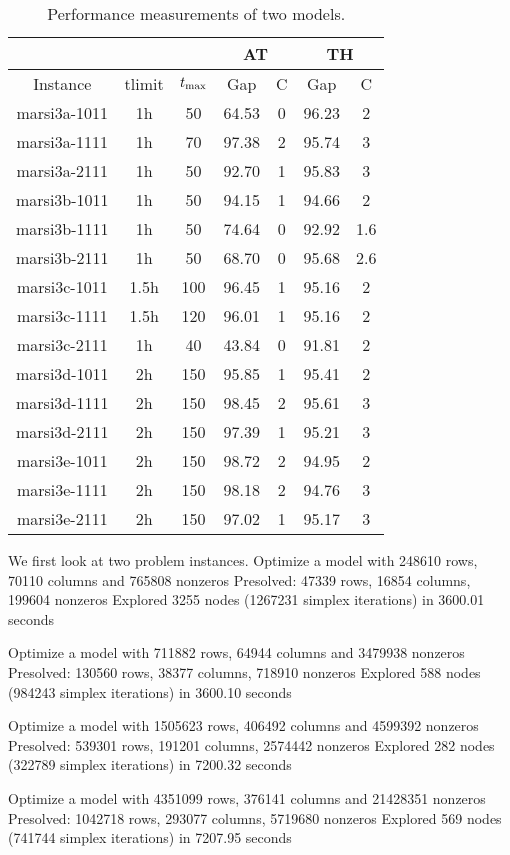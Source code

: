 \begin{table}[h]
    \begin{center}
        \begin{tabular}{|c|c|c|c|c|c|c|}
            \cline{4-7}
            \multicolumn{3}{l}{\ } & \multicolumn{2}{|c|}{AT} &
            \multicolumn{2}{|c|}{TH}\\
            \hline
            Instance & tlimit & $t_{\max}$ & Gap & C & Gap & C\\
            \hline
            marsi3a-1011 & 1h & 50 & 64.53 & 0 & 96.23 & 2\\
            marsi3a-1111 & 1h & 70 & 97.38 & 2 & 95.74 & 3\\
            marsi3a-2111 & 1h & 50 & 92.70 & 1 & 95.83 & 3\\
            marsi3b-1011 & 1h & 50 & 94.15 & 1 & 94.66 & 2\\
            marsi3b-1111 & 1h & 50 & 74.64 & 0 & 92.92 & 1.6\\
            marsi3b-2111 & 1h & 50 & 68.70 & 0 & 95.68 & 2.6\\
            marsi3c-1011 & 1.5h & 100 & 96.45 & 1 & 95.16 & 2\\
            marsi3c-1111 & 1.5h & 120 & 96.01 & 1 & 95.16 & 2\\
            marsi3c-2111 & 1h & 40 & 43.84 & 0 & 91.81 & 2\\
            marsi3d-1011 & 2h & 150 & 95.85 & 1 & 95.41 & 2\\
            marsi3d-1111 & 2h & 150 & 98.45 & 2 & 95.61 & 3\\
            marsi3d-2111 & 2h & 150 & 97.39 & 1 & 95.21 & 3\\
            marsi3e-1011 & 2h & 150 & 98.72 & 2 & 94.95 & 2\\
            marsi3e-1111 & 2h & 150 & 98.18 & 2 & 94.76 & 3\\
            marsi3e-2111 & 2h & 150 & 97.02 & 1 & 95.17 & 3\\
            \hline
        \end{tabular}
        \caption{Performance measurements of two models.}
        \label{tbl:compare}
    \end{center}
\end{table}

We first look at two problem instances.
Optimize a model with 248610 rows, 70110 columns and 765808 nonzeros
Presolved: 47339 rows, 16854 columns, 199604 nonzeros
Explored 3255 nodes (1267231 simplex iterations) in 3600.01 seconds

Optimize a model with 711882 rows, 64944 columns and 3479938 nonzeros
Presolved: 130560 rows, 38377 columns, 718910 nonzeros
Explored 588 nodes (984243 simplex iterations) in 3600.10 seconds

Optimize a model with 1505623 rows, 406492 columns and 4599392 nonzeros
Presolved: 539301 rows, 191201 columns, 2574442 nonzeros
Explored 282 nodes (322789 simplex iterations) in 7200.32 seconds

Optimize a model with 4351099 rows, 376141 columns and 21428351 nonzeros
Presolved: 1042718 rows, 293077 columns, 5719680 nonzeros
Explored 569 nodes (741744 simplex iterations) in 7207.95 seconds

